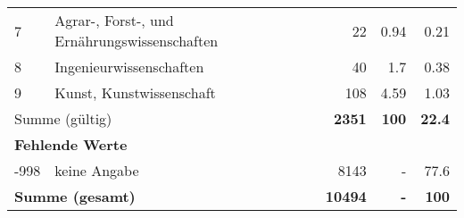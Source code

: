 \begin{longtable}{lXrrr}
     7 &
     \multicolumn{1}{X}{ Agrar-, Forst-, und Ernährungswissenschaften   } &


       \num{22} &
       \num[round-mode=places,round-precision=2]{0,94} &
         \num[round-mode=places,round-precision=2]{0,21} \\

     8 &
     \multicolumn{1}{X}{ Ingenieurwissenschaften   } &


       \num{40} &
       \num[round-mode=places,round-precision=2]{1,7} &
         \num[round-mode=places,round-precision=2]{0,38} \\

     9 &
     \multicolumn{1}{X}{ Kunst, Kunstwissenschaft   } &


       \num{108} &
       \num[round-mode=places,round-precision=2]{4,59} &
         \num[round-mode=places,round-precision=2]{1,03} \\
     \midrule
     \multicolumn{2}{l}{Summe (gültig)} &
       \textbf{\num{2351}} &
     \textbf{100} &
       \textbf{\num[round-mode=places,round-precision=2]{22,4}} \\
     \multicolumn{5}{l}{\textbf{Fehlende Werte}}\\
       -998 &
       keine Angabe &
         \num{8143} &
        - &
         \num[round-mode=places,round-precision=2]{77,6} \\
     \midrule
     \multicolumn{2}{l}{\textbf{Summe (gesamt)}} &
          \textbf{\num{10494}} &
        \textbf{-} &
        \textbf{100} \\
     \bottomrule
     \end{longtable}
     
